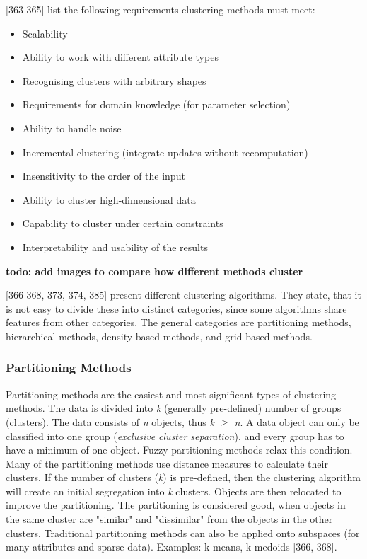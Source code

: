 

\textcite{han2011data}[363-365] list the following requirements  clustering methods must meet:
\begin{itemize}
  \item Scalability
  \item Ability to work with different attribute types
  \item Recognising clusters with arbitrary shapes
  \item Requirements for domain knowledge (for parameter selection)
  \item Ability to handle noise
  \item Incremental clustering (integrate updates without recomputation)
  \item Insensitivity to the order of the input
  \item Ability to cluster high-dimensional data 
  \item Capability to cluster under certain constraints
  \item Interpretability and usability of the results
\end{itemize}


\textbf{todo: add images to compare how different methods cluster}


\textcite{han2011data}[366-368, 373, 374, 385] present different clustering algorithms. They state, that it is not easy to divide these into distinct categories, since some algorithms share features from other categories. The general categories are partitioning methods, hierarchical methods, density-based methods, and grid-based methods.

  \subsubsection{Partitioning Methods}
  Partitioning methods are the easiest and most significant types of clustering methods. The data is divided into \textit{k} (generally pre-defined) number of groups (clusters). The data consists of \textit{n} objects, thus \textit{k $\geq$ n}. A data object can only be classified into one group (\textit{exclusive cluster separation}), and every group has to have a minimum of one object. Fuzzy partitioning methods relax this condition.
  Many of the partitioning methods use distance measures to calculate their clusters. If the number of clusters (\textit{k}) is pre-defined, then the clustering algorithm will create an initial segregation into \textit{k} clusters. Objects are then relocated to improve the partitioning. The partitioning is considered good, when objects in the same cluster are "similar" and "dissimilar" from the objects in the other clusters. Traditional partitioning methods can also be applied onto subspaces (for many attributes and sparse data).  Examples: k-means, k-medoids \autocite{han2011data}[366, 368].
  




